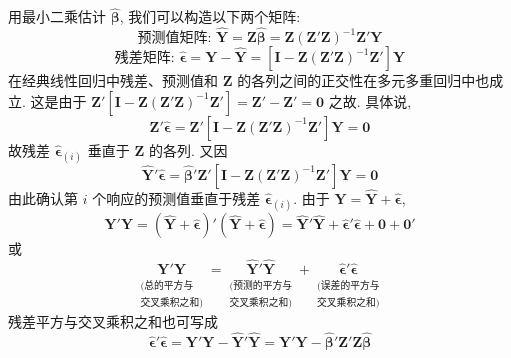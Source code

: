 用最小二乘估计 $\hat{\boldsymbol{\beta}}$, 我们可以构造以下两个矩阵:
\[
\text{预测值矩阵: }\hat{\mathbf{Y}}=\mathbf{Z}\hat{\boldsymbol{\beta}}=\mathbf{Z}(\mathbf{Z}'\mathbf{Z})^{-1}\mathbf{Z}'\mathbf{Y}
\]
\label{eq:7-28}
\begin{equation}
\text{残差矩阵: }\hat{\boldsymbol{\epsilon}}=\mathbf{Y}-\hat{\mathbf{Y}}=[\mathbf{I}-\mathbf{Z}(\mathbf{Z}'\mathbf{Z})^{-1}\mathbf{Z}']\mathbf{Y} \tag{7-28}
\end{equation}
在经典线性回归中残差、预测值和 $\mathbf{Z}$ 的各列之间的正交性在多元多重回归中也成立. 这是由于 $\mathbf{Z}'[\mathbf{I}-\mathbf{Z}(\mathbf{Z}'\mathbf{Z})^{-1}\mathbf{Z}']=\mathbf{Z}'-\mathbf{Z}'=\mathbf{0}$ 之故. 具体说,
\label{eq:7-29}
\begin{equation}
\mathbf{Z}'\hat{\boldsymbol{\epsilon}}=\mathbf{Z}'[\mathbf{I}-\mathbf{Z}(\mathbf{Z}'\mathbf{Z})^{-1}\mathbf{Z}']\mathbf{Y}=\mathbf{0} \tag{7-29}
\end{equation}
故残差 $\hat{\boldsymbol{\epsilon}}_{(i)}$ 垂直于 $\mathbf{Z}$ 的各列. 又因
\label{eq:7-30}
\begin{equation}
\hat{\mathbf{Y}}'\hat{\boldsymbol{\epsilon}}=\hat{\boldsymbol{\beta}}'\mathbf{Z}'[\mathbf{I}-\mathbf{Z}(\mathbf{Z}'\mathbf{Z})^{-1}\mathbf{Z}']\mathbf{Y}=\mathbf{0} \tag{7-30}
\end{equation}
由此确认第 $i$ 个响应的预测值垂直于残差 $\hat{\boldsymbol{\epsilon}}_{(i)}$. 由于 $\mathbf{Y}=\hat{\mathbf{Y}}+\hat{\boldsymbol{\epsilon}}$,
\[
\mathbf{Y}'\mathbf{Y}=(\hat{\mathbf{Y}}+\hat{\boldsymbol{\epsilon}})'(\hat{\mathbf{Y}}+\hat{\boldsymbol{\epsilon}})=\hat{\mathbf{Y}}'\hat{\mathbf{Y}}+\hat{\boldsymbol{\epsilon}}'\hat{\boldsymbol{\epsilon}}+\mathbf{0}+\mathbf{0}'
\]
或
\label{eq:7-31}
\begin{equation}
\underset{\substack{\text{(总的平方与}\\\text{交叉乘积之和)}}}{\mathbf{Y}'\mathbf{Y}}=\underset{\substack{\text{(预测的平方与}\\\text{交叉乘积之和)}}}{\hat{\mathbf{Y}}'\hat{\mathbf{Y}}}+\underset{\substack{\text{(误差的平方与}\\\text{交叉乘积之和)}}}{\hat{\boldsymbol{\epsilon}}'\hat{\boldsymbol{\epsilon}}} \tag{7-31}
\end{equation}
残差平方与交叉乘积之和也可写成
\label{eq:7-32}
\begin{equation}
\hat{\boldsymbol{\epsilon}}'\hat{\boldsymbol{\epsilon}}=\mathbf{Y}'\mathbf{Y}-\hat{\mathbf{Y}}'\hat{\mathbf{Y}}=\mathbf{Y}'\mathbf{Y}-\hat{\boldsymbol{\beta}}'\mathbf{Z}'\mathbf{Z}\hat{\boldsymbol{\beta}} \tag{7-32}
\end{equation}

